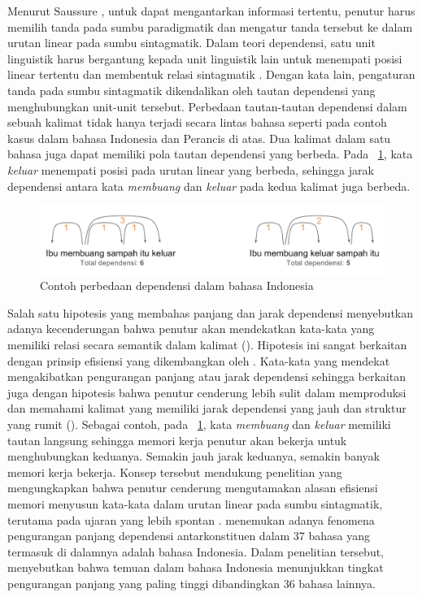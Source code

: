 Menurut Saussure \citep{key2017course}, untuk dapat mengantarkan informasi tertentu, penutur harus memilih tanda pada sumbu paradigmatik dan mengatur tanda tersebut ke dalam urutan linear pada sumbu sintagmatik. Dalam teori dependensi, satu unit linguistik harus bergantung kepada unit linguistik lain untuk menempati posisi linear tertentu dan membentuk relasi sintagmatik \citep{tesniere1959elements}. Dengan kata lain, pengaturan tanda pada sumbu sintagmatik dikendalikan oleh tautan dependensi yang menghubungkan unit-unit tersebut. Perbedaan tautan-tautan dependensi dalam sebuah kalimat tidak hanya terjadi secara lintas bahasa seperti pada contoh kasus dalam bahasa Indonesia dan Perancis di atas. Dua kalimat dalam satu bahasa juga dapat memiliki pola tautan dependensi yang berbeda. Pada \pic~\ref{fig:contoh-dependensi}, kata \textit{keluar} menempati posisi pada urutan linear yang berbeda, sehingga jarak dependensi antara kata \textit{membuang} dan \textit{keluar} pada kedua kalimat juga berbeda. 
\begin{figure}
	\centering \includegraphics[width=1
	\textwidth] {pics/contoh-dependensi.png} \caption{Contoh perbedaan dependensi dalam bahasa Indonesia} 
\label{fig:contoh-dependensi} \end{figure}

Salah satu hipotesis yang membahas panjang dan jarak dependensi menyebutkan adanya kecenderungan bahwa penutur akan mendekatkan kata-kata yang memiliki relasi secara semantik dalam kalimat (\citealp{futrell2015large, liu2017dependency}). Hipotesis ini sangat berkaitan dengan prinsip efisiensi yang dikembangkan oleh \cite{hawkins2004efficiency}. Kata-kata yang mendekat mengakibatkan pengurangan panjang atau jarak dependensi sehingga berkaitan juga dengan hipotesis bahwa penutur cenderung lebih sulit dalam memproduksi dan memahami kalimat yang memiliki jarak dependensi yang jauh dan struktur yang rumit (\citealp{hawkins2004efficiency, dillon2011structured}). Sebagai contoh, pada \pic~\ref{fig:contoh-dependensi}, kata \textit{membuang} dan \textit{keluar} memiliki tautan langsung sehingga memori kerja penutur akan bekerja untuk menghubungkan keduanya. Semakin jauh jarak keduanya, semakin banyak memori kerja bekerja. Konsep tersebut mendukung penelitian \cite{jaeger2006redundancy} yang mengungkapkan bahwa penutur cenderung mengutamakan alasan efisiensi memori menyusun kata-kata dalam urutan linear pada sumbu sintagmatik, terutama pada ujaran yang lebih spontan \citep{jaeger2006redundancy}. \cite{futrell2015large} menemukan adanya fenomena pengurangan panjang dependensi antarkonstituen dalam 37 bahasa yang termasuk di dalamnya adalah bahasa Indonesia. Dalam penelitian tersebut, \cite{futrell2015large} menyebutkan bahwa temuan dalam bahasa Indonesia menunjukkan tingkat pengurangan panjang yang paling tinggi dibandingkan 36 bahasa lainnya. 

